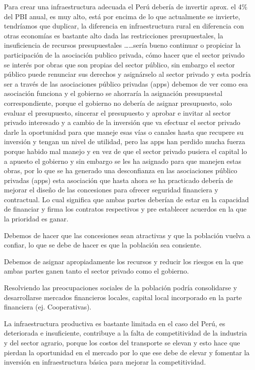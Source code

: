 \documentclass[
  letterpaper,
  DIV=11,
  numbers=noendperiod]{scrartcl}
\begin{document}
Para crear una infraestructura adecuada el Perú debería de invertir
aprox. el 4\% del PBI anual, es muy alto, está por encima de lo que
actualmente se invierte, tendríamos que duplicar, la diferencia en
infraestructura rural en diferencia con otras economías es bastante alto
dada las restricciones presupuestales, la insuficiencia de recursos
presupuestales \ldots\ldots sería bueno continuar o propiciar la
participación de la asociación publico privada, cómo hacer que el sector
privado se interés por obras que son propias del sector público, sin
embargo el sector público puede renunciar sus derechos y asignárselo al
sector privado y esta podría ser a través de las asociaciones público
privadas (apps) debemos de ver como esa asociación funciona y el
gobierno se ahorraría la asignación presupuestal correspondiente, porque
el gobierno no debería de asignar presupuesto, solo evaluar el
presupuesto, sincerar el presupuesto y aprobar e invitar al sector
privado interesado y a cambio de la inversión que va efectuar el sector
privado darle la oportunidad para que maneje esas vías o canales hasta
que recupere su inversión y tengan un nivel de utilidad, pero las apps
han perdido mucha fuerza porque habido mal manejo y en vez de que el
sector privado pusiera el capital lo a apuesto el gobierno y sin embargo
se les ha asignado para que manejen estas obras, por lo que se ha
generado una desconfianza en las asociaciones público privadas (apps)
esta asociación que hasta ahora se ha practicado debería de mejorar el
diseño de las concesiones para ofrecer seguridad financiera y
contractual. Lo cual significa que ambas partes deberían de estar en la
capacidad de financiar y firma los contratos respectivos y pre
establecer acuerdos en la que la prioridad es ganar.

Debemos de hacer que las concesiones sean atractivas y que la población
vuelva a confiar, lo que se debe de hacer es que la población sea
consiente.

Debemos de asignar apropiadamente los recursos y reducir los riesgos en
la que ambas partes ganen tanto el sector privado como el gobierno.

Resolviendo las preocupaciones sociales de la población podría
consolidarse y desarrollarse mercados financieros locales, capital local
incorporado en la parte financiera (ej. Cooperativas).

La infraestructura productiva es bastante limitada en el caso del Perú,
es deteriorada e insuficiente, contribuye a la falta de competitividad
de la industria y del sector agrario, porque los costos del transporte
se elevan y esto hace que pierdan la oportunidad en el mercado por lo
que ese debe de elevar y fomentar la inversión en infraestructura básica
para mejorar la competitividad.
\end{document}
